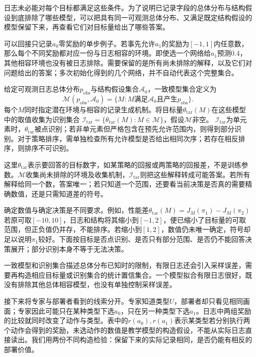 日志未必能对每个目标都满足这些条件。为了说明已记录字段的总体分布与结构假设到底排除了哪些模型，可以把具有同一可观测总体分布、又满足既定结构假设的模型保留下来，再查看它们对目标量给出了哪些答案。

可以回接只记录$a_0$零奖励的单步例子。若事先允许$a_1$的奖励为$[-1,1]$内任意数，那么每个不同奖励都对应一份与日志相容的环境。即使选一个网络给$a_1$预测0.4，其他相容环境也没有被日志排除。需要保留的是所有尚未排除的解释，以及它们对问题给出的答案；多次初始化得到的几个网络，并不自动代表这个完整集合。

\begin{definition}[一致模型集合与识别集合]
  \label{def:rl-information-identified-set}
  给定可观测日志总体分布$p_{\mathrm{obs}}$与结构假设集合$\mathcal A_0$，一致模型集合定义为
  \[
    \mathcal M(p_{\mathrm{obs}},\mathcal A_0)
       =\{M:M\text{满足}\mathcal A_0
                  \text{且产生}p_{\mathrm{obs}}\}.
  \]
  每个$M$同时指定潜在环境与相容的记录生成机制。将目标量$\theta_{\mathrm{tar}}(M)$在这些模型中的取值收集为识别集合
  $\mathcal I_{\mathrm{tar}}=\{\theta_{\mathrm{tar}}(M):M\in\mathcal M\}$，假设$\mathcal M$非空。
  $\mathcal I_{\mathrm{tar}}$为单元素时，$\theta_{\mathrm{tar}}$被点识别；若非单元素但严格包含在预先允许范围内，则得到部分识别。对于策略排序，需单独检查所有允许模型是否给出相同次序；若存在相反排序，则排序不可识别。
\end{definition}

这里$\theta_{\mathrm{tar}}$表示要回答的目标数字，如某策略的回报或两策略的回报差，不是训练参数。$\mathcal M$收集尚未排除的环境及收集机制，$\mathcal I_{\mathrm{tar}}$则把这些解释转成可能答案。若所有解释给同一个数，答案唯一；若只知道一个范围，还要看当前决策是否真的需要精确数值，还是只需知道差的符号。

确定数值与确定决策是不同要求。例如，性能差$\theta_{\mathrm{tar}}(M)=J_M(\pi_1)-J_M(\pi_2)$若原可取$[-10,10]$，日志和结构将其缩小到$[-1,2]$，便已缩小了目标量的可取范围，但正负值仍并存，不能排序。若缩小到$[1,2]$，数值仍未唯一确定，符号却足以说明$\pi_1$较好。下面按目标是否点识别、是否只有部分范围、是否仍不能回答决策展开；部分识别本身不等于无法决策。

一致模型和识别集合描述总体分布已知时的限制，有限日志还会引入采样误差，需要再构造相应目标量或识别集合的统计置信集合。一个模型拟合有限日志很好，既没有排除其他总体相容模型，也没有单独控制采样误差。

接下来将专家与部署者看到的线索分开。专家知道类型$U$，部署者却只看见相同画面；专家因此可能只在某种类型下选$a_0$，只在另一种类型下选$a_1$。日志中两组奖励的比较就同时改变了动作与类型。表中的$r(a_0),r(a_1)$表示某类型若分别执行两个动作会得到的奖励，未选动作的数值是教学模型的构造假设，不能从实际日志直接读出。我们用两份不同构造检验：保留下来的实际记录相同，是否仍能有相反的部署价值。

